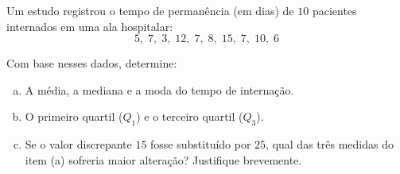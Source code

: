 %
%


\begin{exercicioBanco}[\valorquestao]
Um estudo registrou o tempo de permanência (em dias) de $10$ pacientes internados em uma ala hospitalar:
\[ 5, \; 7, \; 3, \; 12, \; 7, \; 8, \; 15, \; 7, \; 10, \; 6 \]

Com base nesses dados, determine:

\begin{enumerate}[(a)]
    \item A média, a mediana e a moda do tempo de internação.
    \item O primeiro quartil ($Q_1$) e o terceiro quartil ($Q_3$).
    \item Se o valor discrepante $15$ fosse substituído por $25$, qual das três medidas do item (a) sofreria maior alteração? Justifique brevemente.
\end{enumerate}
\end{exercicioBanco}
